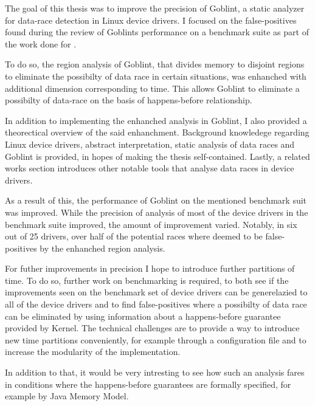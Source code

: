 \documentclass[..thesis.tex]{subfiles}
\begin{document}
The goal of this thesis was to improve the precision of Goblint, a static analyzer for data-race detection in Linux device drivers. I focused on the false-positives found during the review of Goblints performance on a benchmark suite as part of the work done for . 

To do so, the region analysis of Goblint, that divides memory to disjoint regions to eliminate the possibilty of data race in certain situations, was enhanched with additional dimension corresponding to time. This allows Goblint to eliminate a possibilty of data-race on the basis of happens-before relationship. 

In addition to implementing the enhanched analysis in Goblint, I also provided a theorectical overview of the said enhanchment. Background knowledege regarding Linux device drivers, abstract interpretation, static analysis of data races and Goblint is provided, in hopes of making the thesis self-contained. Lastly, a related works section introduces other notable tools that analyse data races in device drivers.

As a result of this, the performance of Goblint on the mentioned benchmark suit was improved. While the precision of analysis of most of the device drivers in the benchmark suite improved, the amount of improvement varied. Notably, in six out of 25 drivers, over half of the potential races where deemed to be false-positives by the enhanched region analysis.
 
For futher improvements in precision I hope to introduce further partitions of time. To do so, further work on benchmarking is required, to both see if the improvements seen on the benchmark set of device drivers can be generelazied to all of the device drivers and to find false-positives where a possibilty of data race can be eliminated by using information about a happens-before guarantee provided by Kernel. The technical challenges are to provide a way to introduce new time partitions conveniently, for example through a configuration file and to increase the modularity of the implementation.

In addition to that, it would be very intresting to see how such an analysis fares in conditions where the happens-before guarantees are formally specified, for example by Java Memory Model.
\end{document}
